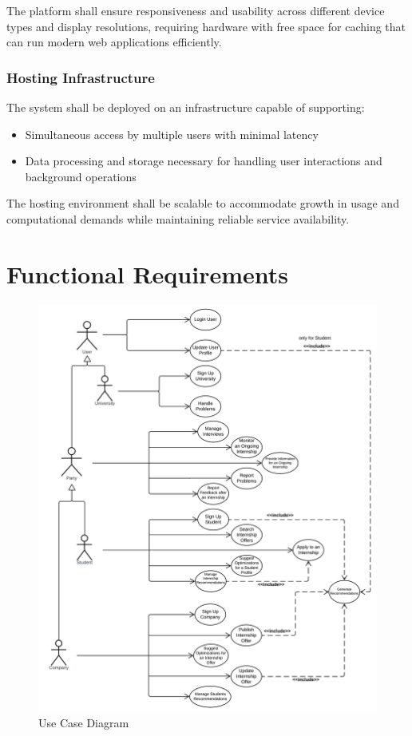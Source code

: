 The platform shall ensure responsiveness and usability across different device types and display resolutions, requiring hardware with free space for caching that can run modern web applications efficiently.

\subsubsection{Hosting Infrastructure}

The system shall be deployed on an infrastructure capable of supporting:

\begin{itemize}
    \item Simultaneous access by multiple users with minimal latency
    \item Data processing and storage necessary for handling user interactions and background operations
\end{itemize}

The hosting environment shall be scalable to accommodate growth in usage and computational demands while maintaining reliable service availability.

\section{Functional Requirements}
\label{sec:functional_requirements}

\begin{figure}[H]
    \begin{center}
        \includegraphics[width=0.9\linewidth]{LaTeXCode/images/Use Case Diagram of S&C.png}
        \caption{Use Case Diagram} 
        \label{fig:use_case_diagram}
    \end{center}
\end{figure}

